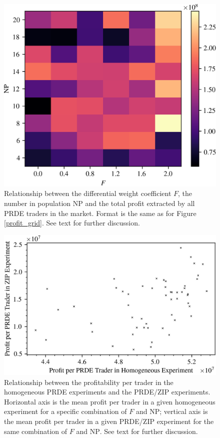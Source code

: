 \documentclass[conference]{IEEEtran}
\begin{document}
\begin{figure}[htbp]
    \centerline{\includegraphics[width=\columnwidth]{zip_profit_grid.png}}
    \caption{
        Relationship between the differential weight coefficient $F$, the number in population $\mathrm{NP}$ and the total profit extracted by all PRDE traders in the market.
        Format is the same as for Figure \ref{profit_grid}.
        See text for further discussion.
    }
    \label{zip}
\end{figure}

\begin{figure}[htbp]
    \centerline{\includegraphics[width=\columnwidth]{homo_zip_scatter.png}}
    \caption{
        Relationship between the profitability per trader in the homogeneous PRDE experiments and the PRDE/ZIP experiments.
        Horizontal axis is the mean profit per trader in a given homogeneous experiment for a specific combination of $F$ and $\mathrm{NP}$; vertical axis is the mean profit per trader in a given PRDE/ZIP experiment for the same combination of $F$ and $\mathrm{NP}$.
        See text for further discussion.
    }
    \label{homo_zip_scatter}
\end{figure}
\end{document}
